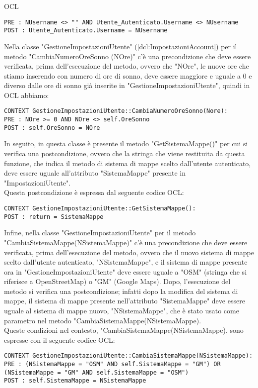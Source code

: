 \begin{listaPersonale}{OCL}
\begin{lstlisting}
PRE : NUsername <> "" AND Utente_Autenticato.Username <> NUsername
POST : Utente_Autenticato.Username = NUsername
    \end{lstlisting}
    Nella classe "GestioneImpostazioniUtente" (\ref{dcl:ImpostazioniAccount}) per il metodo "CambiaNumeroOreSonno (NOre)" c'è una precondizione che deve essere verificata, prima dell'esecuzione del metodo, ovvero che "NOre", le nuove ore che stiamo inserendo con numero di ore di sonno, deve essere maggiore e uguale a 0 e diverso dalle ore di sonno già inserite in "GestioneImpostazioniUtente", quindi in OCL abbiamo:
    \begin{lstlisting} 
CONTEXT GestioneImpostazioniUtente::CambiaNumeroOreSonno(Nore):
PRE : NOre >= 0 AND NOre <> self.OreSonno
POST : self.OreSonno = NOre
    \end{lstlisting}
    In seguito, in questa classe è presente il metodo "GetSistemaMappe()" per cui si verifica una postcondizione, ovvero che la stringa che viene restituita da questa funzione, che indica il metodo di sistema di mappe scelto dall'utente autenticato, deve essere uguale all'attributo "SistemaMappe" presente in "ImpostazioniUtente". \\ Questa postcondizione è espressa dal seguente codice OCL:\\
    \begin{lstlisting}
CONTEXT GestioneImpostazioniUtente::GetSistemaMappe():
POST : return = SistemaMappe 
    \end{lstlisting}
    Infine, nella classe "GestioneImpostazioniUtente" per il metodo \\"CambiaSistemaMappe(NSistemaMappe)" c'è una precondizione che deve essere verificata, prima dell'esecuzione del metodo, ovvero che il nuovo sistema di mappe scelto dall'utente autenticato, "NSistemaMappe", e il sistema di mappe presente ora in "GestioneImpostazioniUtente" deve essere uguale a "OSM" (stringa che si riferisce a OpenStreetMap) o "GM" (Google Maps).
    Dopo, l'esecuzione del metodo si verifica una postcondizione; infatti dopo la modifica del sistema di mappe, il sistema di mappe presente nell'attributo "SistemaMappe" deve essere uguale al sistema di mappe nuovo, "NSistemaMappe", che è stato usato come parametro nel metodo "CambiaSistemaMappe(NSistemaMappe).\\
    Queste condizioni nel contesto, "CambiaSistemaMappe(NSistemaMappe), sono espresse con il seguente codice OCL:

    \begin{lstlisting}
CONTEXT GestioneImpostazioniUtente::CambiaSistemaMappe(NSistemaMappe):
PRE : (NSistemaMappe = "OSM" AND self.SistemaMappe = "GM") OR (NSistemaMappe = "GM" AND self.SistemaMappe = "OSM")
POST : self.SistemaMappe = NSistemaMappe
    \end{lstlisting}





\end{listaPersonale}
